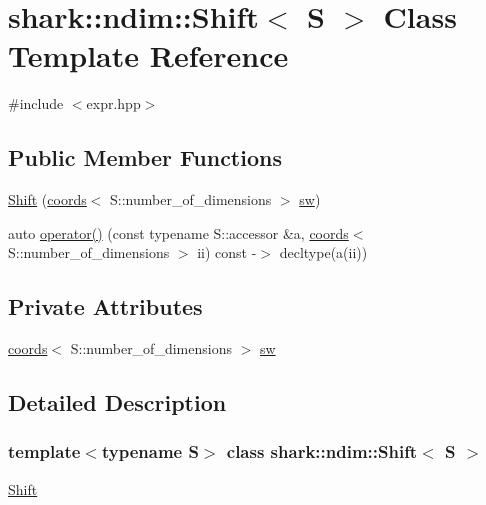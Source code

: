 \hypertarget{classshark_1_1ndim_1_1_shift}{}\section{shark\+:\+:ndim\+:\+:Shift$<$ S $>$ Class Template Reference}
\label{classshark_1_1ndim_1_1_shift}


{\ttfamily \#include $<$expr.\+hpp$>$}

\subsection*{Public Member Functions}
\begin{DoxyCompactItemize}
\item 
\hyperlink{classshark_1_1ndim_1_1_shift_adb6138a4655f902116238e4e08e47e68}{Shift} (\hyperlink{structshark_1_1ndim_1_1coords}{coords}$<$ S\+::number\+\_\+of\+\_\+dimensions $>$ \hyperlink{classshark_1_1ndim_1_1_shift_a3bd6f579c282ca70d391bd43bc582331}{sw})
\item 
auto \hyperlink{classshark_1_1ndim_1_1_shift_ac2095531d2a9060eae224166379e4e39}{operator()} (const typename S\+::accessor \&a, \hyperlink{structshark_1_1ndim_1_1coords}{coords}$<$ S\+::number\+\_\+of\+\_\+dimensions $>$ ii) const -\/$>$ decltype(a(ii))
\end{DoxyCompactItemize}
\subsection*{Private Attributes}
\begin{DoxyCompactItemize}
\item 
\hyperlink{structshark_1_1ndim_1_1coords}{coords}$<$ S\+::number\+\_\+of\+\_\+dimensions $>$ \hyperlink{classshark_1_1ndim_1_1_shift_a3bd6f579c282ca70d391bd43bc582331}{sw}
\end{DoxyCompactItemize}


\subsection{Detailed Description}
\subsubsection*{template$<$typename S$>$\newline
class shark\+::ndim\+::\+Shift$<$ S $>$}

\hyperlink{classshark_1_1ndim_1_1_shift}{Shift} 

